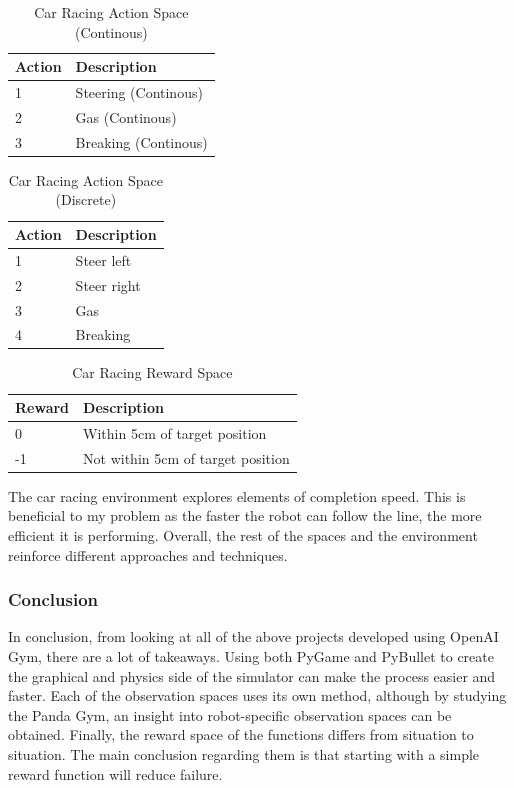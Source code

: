 \documentclass[a4paper,12pt]{article}
\begin{document}
\begin{table}[H]
\centering
\caption{Car Racing Action Space (Continous)}
\label{tab:Car Racing Action Space (Continous)}
\begin{tabular}{|ll|}
\hline
\textbf{Action} & \textbf{Description}\\ \hline
1 & Steering (Continous)\\ 
2 & Gas (Continous)\\ 
3 & Breaking (Continous)\\ \hline
\end{tabular}

\end{table}
\begin{table}[H]
\centering
\caption{Car Racing Action Space (Discrete)}
\label{tab:Car Racing Action Space (Discrete)}
\begin{tabular}{|ll|}
\hline
\textbf{Action} & \textbf{Description}\\ \hline
1 & Steer left \\ 
2 & Steer right \\ 
3 & Gas \\ 
4 & Breaking \\ \hline
\end{tabular}
\end{table}

\begin{table}[H]
\centering
\caption{Car Racing Reward Space}
\label{tab:Car Racing Reward Space}
\begin{tabular}{|ll|}
\hline
\textbf{Reward} & \textbf{Description}\\ \hline
0 & Within 5cm of target position\\ 
-1 & Not within 5cm of target position \\ \hline
\end{tabular}
\end{table}
\noindent
The car racing environment explores elements of completion speed. This is beneficial to my problem as the faster the robot can follow the line, the more efficient it is performing. Overall, the rest of the spaces and the environment reinforce different approaches and techniques. 

\subsubsection{Conclusion}
In conclusion, from looking at all of the above projects developed using OpenAI Gym, there are a lot of takeaways. Using both PyGame and PyBullet to create the graphical and physics side of the simulator can make the process easier and faster. Each of the observation spaces uses its own method, although by studying the Panda Gym, an insight into robot-specific observation spaces can be obtained. Finally, the reward space of the functions differs from situation to situation. The main conclusion regarding them is that starting with a simple reward function will reduce failure. 
\end{document}
